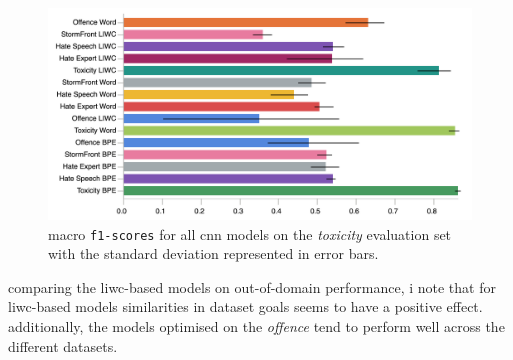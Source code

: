\begin{figure}
    \centering
    \includegraphics[width=\textwidth]{all_cnn_wulczyn_test.pdf}
    \caption{macro \texttt{f1-scores} for all cnn models on the \textit{toxicity} evaluation set with the standard deviation represented in error bars.}
    \label{fig:wulczyn_cnn_test}
\end{figure}

comparing the liwc-based models on out-of-domain performance, i note that for liwc-based models similarities in dataset goals seems to have a positive effect.
additionally, the models optimised on the \textit{offence} tend to perform well across the different datasets.


